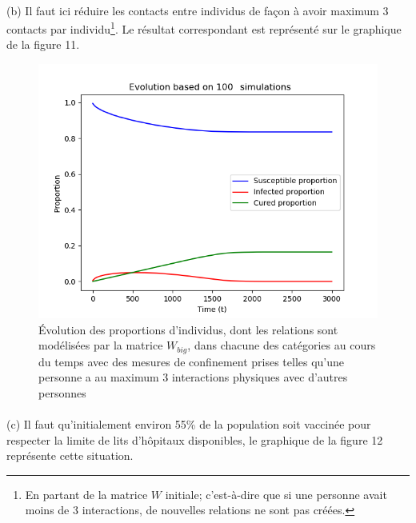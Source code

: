 \documentclass[a4paper, 12pt, oneside]{article}
\begin{document}
\paragraph{}(b) Il faut ici réduire les contacts entre individus de façon à avoir maximum 3 contacts par individu\footnote{En partant de la matrice $W$ initiale; c'est-à-dire que si une personne avait moins de 3 interactions, de nouvelles relations ne sont pas créées.}. Le résultat correspondant est représenté sur le graphique de la figure 11.

\begin{figure}[H]
	\centering
	\includegraphics[scale=1]{Wbig_dense_containment_comparaison.png} 
	\caption{Évolution des proportions d'individus, dont les relations sont modélisées par la matrice $W_{big}$, dans chacune des catégories au cours du temps avec des mesures de confinement prises telles qu'une personne a au maximum 3 interactions physiques avec d'autres personnes}
\end{figure}

\paragraph{}(c) Il faut qu'initialement environ 55\% de la population soit vaccinée pour respecter la limite de lits d'hôpitaux disponibles, le graphique de la figure 12 représente cette situation.
\end{document}
